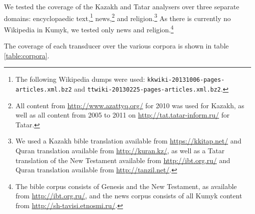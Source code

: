 \documentclass[a4paper,11pt,twocolumn]{article}
\begin{document}
We tested the coverage of the Kazakh and Tatar analysers over three separate domains: encyclopaedic text,\footnote{The following Wikipedia dumps were used: \texttt{kkwiki-20131006-pages-articles.xml.bz2} and \texttt{ttwiki-20130225-pages-articles.xml.bz2}.}
 news,\footnote{All content from \url{http://www.azattyq.org/} for 2010 was used for Kazakh, as well as all content from 2005 to 2011 on \url{http://tat.tatar-inform.ru/} for Tatar.} and religion.\footnote{We used a Kazakh bible translation available from \url{https://kkitap.net/} and Quran translation available from \url{http://kuran.kz/}, as well as a Tatar translation of the New Testament available from \url{http://ibt.org.ru/} and Quran translation available from \url{http://tanzil.net/}.}  As there is currently no Wikipedia in Kumyk, we tested only news and religion.\footnote{The bible corpus consists of Genesis and the New Testament, as available from \url{http://ibt.org.ru/}, and the news corpus consists of all Kumyk content from \url{http://sh-tavisi.etnosmi.ru/}.}




The coverage of each transducer over the various corpora is shown in table \ref{table:corpora}.
\end{document}
